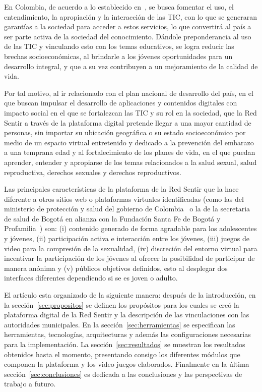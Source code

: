 \documentclass[a4paper]{article}
\begin{document}
En Colombia, de acuerdo a lo establecido en~\citep{Plan2014}, se busca fomentar el uso, el entendimiento, la apropiación y la interacción de las TIC, con lo que se generaran garantías a la sociedad para acceder a estos servicios, lo que convertirá al país a ser parte activa de la sociedad del conocimiento. Dándole preponderancia al uso de las TIC y vinculando esto con los temas educativos, se logra reducir las brechas socioeconómicas, al brindarle a los jóvenes oportunidades para un desarrollo integral, y que a su vez contribuyen a un mejoramiento de la calidad de vida.

Por tal motivo, al ir relacionado con el plan nacional de desarrollo del país, en el que buscan impulsar el desarrollo de aplicaciones y contenidos digitales con impacto social en el que se fortalezcan las TIC y su rol en la sociedad, que la Red Sentir a través de la plataforma digital pretende llegar a una mayor cantidad de personas, sin importar su ubicación geográfica o su estado socioeconómico por medio de un espacio virtual entretenido y dedicado a la prevención del embarazo a una temprana edad y al fortalecimiento de los planes de vida, en el que puedan aprender, entender y apropiarse de los temas relacionados a la salud sexual, salud reproductiva, derechos sexuales y derechos reproductivos.

Las principales características de la plataforma de la Red Sentir que la hace diferente a otros sitios web o plataformas virtuales identificadas (como las del ministerio de protección y salud del gobierno de Colombia~\citep{PagGob2018} o la de la secretaria de salud de Bogotá en alianza con la Fundación Santa Fe de Bogotá y Profamilia~\citep{Sexperto2018}) son: (i) contenido generado de forma agradable para los adolescentes y jóvenes, (ii) participación activa e interacción entre los jóvenes, (iii) juegos de video para la compresión de la sexualidad, (iv) discreción del entorno virtual para incentivar la participación de los jóvenes al ofrecer la posibilidad de participar de manera anónima y (v) públicos objetivos definidos, esto al desplegar dos interfaces diferentes dependiendo si se es joven o adulto.  

El artículo esta organizado de la siguiente manera: después de la introducción, en la sección~\ref{sec:propositos} se definen los propósitos para los cuales se creó la plataforma digital de la Red Sentir y la descripción de las vinculaciones con las autoridades municipales. En la sección~\ref{sec:herramientas} se especifican las herramientas, tecnologías, arquitecturas y además las configuraciones necesarias para la implementación. La sección~\ref{sec:resultados} se muestran los resultados obtenidos hasta el momento, presentando consigo los diferentes módulos que componen la plataforma y los video juegos elaborados. Finalmente en la última sección~\ref{sec:conclusiones} es dedicada a las conclusiones y las perspectivas de trabajo a futuro.
\end{document}
